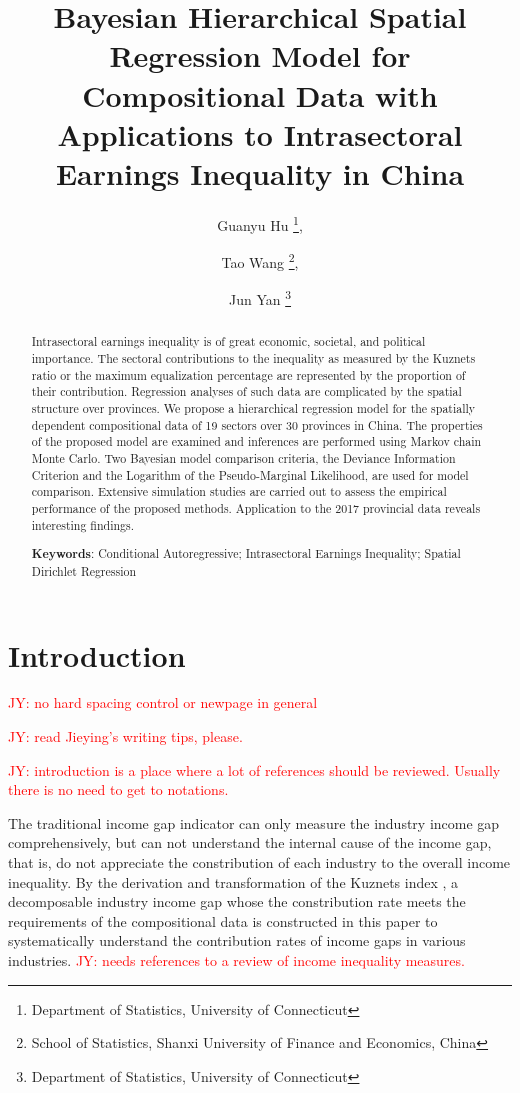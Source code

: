 \documentclass[12pt, titlepage]{article}
\title{Bayesian Hierarchical Spatial Regression Model for Compositional Data with Applications to Intrasectoral Earnings Inequality in China}
\author{
  Guanyu Hu
  \footnote{Department of Statistics, University of Connecticut},
  \and
  Tao Wang
  \footnote{School of Statistics, Shanxi University of Finance and
    Economics, China},
  \and
  Jun Yan
  \footnote{Department of Statistics, University of
    Connecticut}
}
\newcommand{\red}[1]{{\textcolor{red}{#1}}}
\begin{document}
\maketitle


\begin{abstract}
Intrasectoral earnings inequality is of great economic, societal, and
political importance. The sectoral contributions to the inequality as
measured by the Kuznets ratio or the maximum equalization percentage
are represented by the proportion of their contribution. Regression
analyses of such data are complicated by the spatial structure over
provinces. We propose a hierarchical regression model for the
spatially dependent compositional data of 19 sectors over 30 provinces
in China. The properties of the proposed model are examined and
inferences are performed using Markov chain Monte Carlo. Two Bayesian
model comparison criteria, the Deviance Information Criterion and the
Logarithm of the Pseudo-Marginal Likelihood, are used for model
comparison. Extensive simulation studies are carried out to assess the
empirical performance of the proposed methods. Application to the 2017
provincial data reveals interesting findings.

\bigskip
\noindent\textbf{Keywords}:
Conditional Autoregressive;
Intrasectoral Earnings Inequality;
Spatial Dirichlet Regression 
\end{abstract}

\doublespacing 


\section{Introduction}


\red{JY: no hard spacing control or newpage in general}

\red{JY: read Jieying's writing tips, please.}

\red{JY: introduction is a place where a lot of references should be
  reviewed. Usually there is no need to get to notations.}

The traditional income gap indicator can only measure the industry
income gap comprehensively, but can not understand the internal cause
of the income gap, that is, do not appreciate the constribution of
each industry to the overall income inequality. By the derivation and
transformation of the Kuznets index \citep{kuznets1955economic}, a
decomposable industry
income gap whose the constribution rate meets the requirements of the
compositional data is constructed in this paper to systematically
understand the contribution rates of income gaps in various
industries.
\red{JY: needs references to a review of income inequality measures.}
\end{document}

